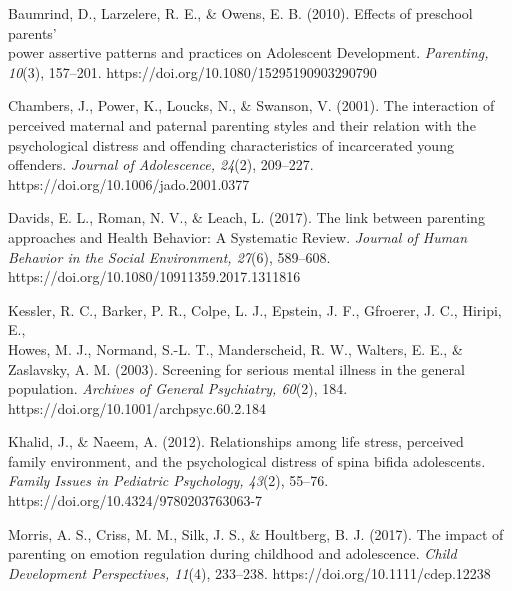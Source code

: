 \documentclass[12pt,letterpaper]{article}
\begin{document}
\noindent Baumrind, D., Larzelere, R. E., \& Owens, E. B. (2010). Effects of preschool parents' \\
\indent power assertive patterns and practices on Adolescent Development. \textit{Parenting,} \\
\indent \textit{10}(3), 157–201. https://doi.org/10.1080/15295190903290790

\noindent Chambers, J., Power, K., Loucks, N., \& Swanson, V. (2001). The interaction of \\ 
\indent perceived maternal and paternal parenting styles and their relation with the \\ 
\indent psychological distress and offending characteristics of incarcerated young \\ 
\indent offenders. \textit{Journal of Adolescence, 24}(2), 209–227. \\ 
\indent https://doi.org/10.1006/jado.2001.0377 

\noindent Davids, E. L., Roman, N. V., \& Leach, L. (2017). The link between parenting \\
\indent approaches and Health Behavior: A Systematic Review. \textit{Journal of Human} \\ 
\indent \textit{Behavior in the Social Environment, 27}(6), 589–608. \\ 
\indent https://doi.org/10.1080/10911359.2017.1311816 

\noindent Kessler, R. C., Barker, P. R., Colpe, L. J., Epstein, J. F., Gfroerer, J. C., Hiripi, E., \\ 
\indent Howes, M. J., Normand, S.-L. T., Manderscheid, R. W., Walters, E. E., \& \\ 
\indent Zaslavsky, A. M. (2003). Screening for serious mental illness in the general \\ 
\indent population. \textit{Archives of General Psychiatry, 60}(2), 184. \\ 
\indent https://doi.org/10.1001/archpsyc.60.2.184 

\noindent Khalid, J., \& Naeem, A. (2012). Relationships among life stress, perceived \\ 
\indent family environment, and the psychological distress of spina bifida adolescents. \\ 
\indent \textit{Family Issues in Pediatric Psychology, 43}(2), 55–76. \\
\indent https://doi.org/10.4324/9780203763063-7 

\noindent Morris, A. S., Criss, M. M., Silk, J. S., \& Houltberg, B. J. (2017). The impact of \\
\indent parenting on emotion regulation during childhood and adolescence. \textit{Child}\\
\indent \textit{Development Perspectives, 11}(4), 233–238. https://doi.org/10.1111/cdep.12238 
\end{document}
